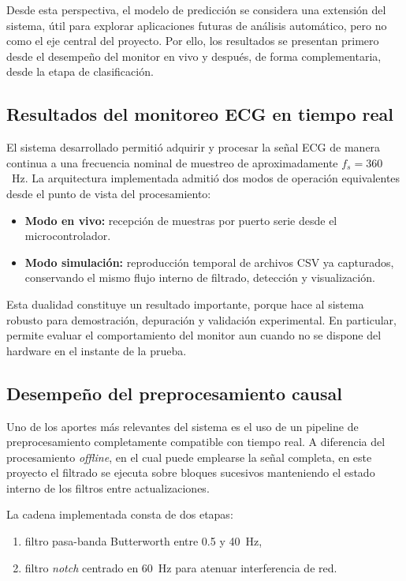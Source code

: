 Desde esta perspectiva, el modelo de predicción se considera una extensión del
sistema, útil para explorar aplicaciones futuras de análisis automático, pero no
como el eje central del proyecto. Por ello, los resultados se presentan primero
desde el desempeño del monitor en vivo y después, de forma complementaria, desde
la etapa de clasificación.

\subsection{Resultados del monitoreo ECG en tiempo real}

El sistema desarrollado permitió adquirir y procesar la señal ECG de manera
continua a una frecuencia nominal de muestreo de aproximadamente $f_s = 360$~Hz.
La arquitectura implementada admitió dos modos de operación equivalentes desde el
punto de vista del procesamiento:

\begin{itemize}
    \item \textbf{Modo en vivo:} recepción de muestras por puerto serie desde el
        microcontrolador.
    \item \textbf{Modo simulación:} reproducción temporal de archivos CSV ya
        capturados, conservando el mismo flujo interno de filtrado,
        detección y visualización.
\end{itemize}

Esta dualidad constituye un resultado importante, porque hace al sistema robusto
para demostración, depuración y validación experimental. En particular, permite
evaluar el comportamiento del monitor aun cuando no se dispone del hardware en el
instante de la prueba.

\subsection{Desempeño del preprocesamiento causal}

Uno de los aportes más relevantes del sistema es el uso de un pipeline de
preprocesamiento completamente compatible con tiempo real. A diferencia del
procesamiento \textit{offline}, en el cual puede emplearse la señal completa, en
este proyecto el filtrado se ejecuta sobre bloques sucesivos manteniendo el
estado interno de los filtros entre actualizaciones.

La cadena implementada consta de dos etapas:

\begin{enumerate}
    \item filtro pasa-banda Butterworth entre 0.5 y 40~Hz,
    \item filtro \textit{notch} centrado en 60~Hz para atenuar interferencia de red.
\end{enumerate}

